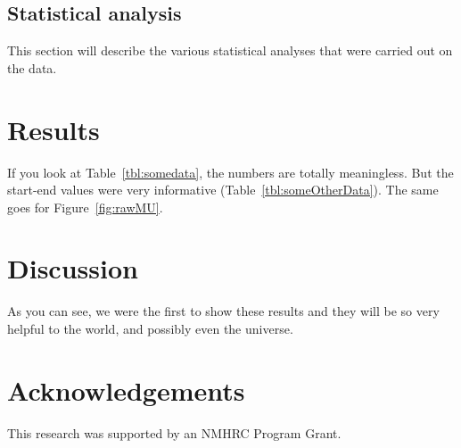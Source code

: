 \documentclass[letterpaper,11pt]{article}
\begin{document}
\subsection*{Statistical analysis}

This section will describe the various statistical analyses that were carried out on the data.


\section*{Results}

If you look at Table~\ref{tbl:somedata}, the numbers are totally meaningless. 
But the start-end values were very informative (Table~\ref{tbl:someOtherData}). 
The same goes for Figure~\ref{fig:rawMU}.

\lipsum[1]


\section*{Discussion}

As you can see, we were the first to show these results and they will be so very helpful to the world, and possibly even the universe.

\lipsum[1-3]


\newpage
\section*{Acknowledgements}

This research was supported by an NMHRC Program Grant.


\newpage



\end{document}

